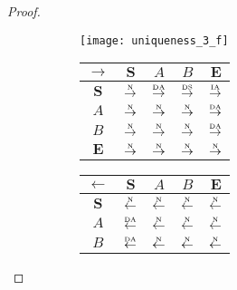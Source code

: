 \begin{proof}
\begin{figure}[htbp]
  \begin{subfigure}{1\textwidth}
    \vspace{1em}
    \centering
    \begin{minipage}[b]{1\textwidth}
      \centering
      \texttt{[image: uniqueness\_3\_f]}
    \end{minipage}
    \begin{minipage}[b]{0.3\textwidth}
      \vspace{1em}
      \centering
      \begin{tabular}{|c|c|c|c|c|} \hline
        $\rightarrow$ & $\bm{S}$ & $A$ & $B$ & $\bm{E}$\\ \hline
        $\bm{S}$ & $\overset{\text{\tiny{N}}}{\rightarrow}$ & $\overset{\text{\tiny{DA}}}{\rightarrow}$ & $\overset{\text{\tiny{DS}}}{\rightarrow}$ & $\overset{\text{\tiny{IA}}}{\rightarrow}$\\ \hline
        $A$ & $\overset{\text{\tiny{N}}}{\rightarrow}$ & $\overset{\text{\tiny{N}}}{\rightarrow}$ & $\overset{\text{\tiny{N}}}{\rightarrow}$ & $\overset{\text{\tiny{DA}}}{\rightarrow}$\\ \hline
        $B$ & $\overset{\text{\tiny{N}}}{\rightarrow}$ & $\overset{\text{\tiny{N}}}{\rightarrow}$ & $\overset{\text{\tiny{N}}}{\rightarrow}$ & $\overset{\text{\tiny{DA}}}{\rightarrow}$\\ \hline
        $\bm{E}$ & $\overset{\text{\tiny{N}}}{\rightarrow}$ & $\overset{\text{\tiny{N}}}{\rightarrow}$ & $\overset{\text{\tiny{N}}}{\rightarrow}$ & $\overset{\text{\tiny{N}}}{\rightarrow}$\\ \hline
      \end{tabular}
    \end{minipage}
    \begin{minipage}[b]{0.3\textwidth}
      \vspace{1em}
      \centering
      \begin{tabular}{|c|c|c|c|c|} \hline
        $\leftarrow$ & $\bm{S}$ & $A$ & $B$ & $\bm{E}$\\ \hline
        $\bm{S}$ & $\overset{\text{\tiny{N}}}{\leftarrow}$ & $\overset{\text{\tiny{N}}}{\leftarrow}$ & $\overset{\text{\tiny{N}}}{\leftarrow}$ & $\overset{\text{\tiny{N}}}{\leftarrow}$\\ \hline
        $A$ & $\overset{\text{\tiny{DA}}}{\leftarrow}$ & $\overset{\text{\tiny{N}}}{\leftarrow}$ & $\overset{\text{\tiny{N}}}{\leftarrow}$ & $\overset{\text{\tiny{N}}}{\leftarrow}$\\ \hline
        $B$ & $\overset{\text{\tiny{DA}}}{\leftarrow}$ & $\overset{\text{\tiny{N}}}{\leftarrow}$ & $\overset{\text{\tiny{N}}}{\leftarrow}$ & $\overset{\text{\tiny{N}}}{\leftarrow}$\\ \hline

\end{tabular}
\end{minipage}
\end{subfigure}
\end{figure}
\end{proof}
